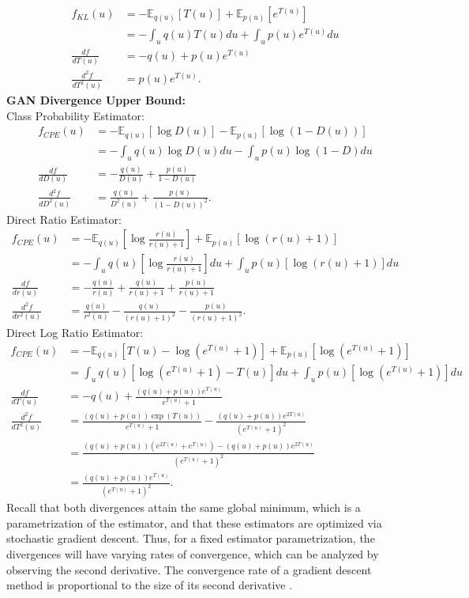 \documentclass[honours,12pt]{unswthesis}
\newcommand{\E}{\mathbb{E}}
\numberwithin{equation}{section}
\theoremstyle{definition}
\begin{document}
\begin{align*}
f_{KL}(u)&=-\E_{q(u)}[T(u)]+\E_{p(u)}[e^{T(u)}]\\
&=-\int_u q(u)T(u)du+\int_u p(u)e^{T(u)}du\\
\frac{df}{dT(u)}&=-q(u)+p(u)e^{T(u)}\\
\frac{d^2f}{dT^2(u)}&=p(u)e^{T(u)}.
\end{align*}
\textbf{GAN Divergence Upper Bound:}\\
Class Probability Estimator:
\begin{align*}
f_{CPE}(u)&=-\E_{q(u)}[\log D(u)]-\E_{p(u)}[\log (1-D(u))]\\
&=-\int_u q(u)\log D(u) du -\int_u p(u)\log(1-D)du\\
\frac{df}{dD(u)}&=-\frac{q(u)}{D(u)}+\frac{p(u)}{1-D(u)}\\
\frac{d^2f}{dD^2(u)}&=\frac{q(u)}{D^2(u)}+\frac{p(u)}{(1-D(u))^2}.
\end{align*}
Direct Ratio Estimator:
\begin{align*}
f_{CPE}(u)&=-\E_{q(u)}\left[\log \frac{r(u)}{r(u)+1}\right]+\E_{p(u)}\left[\log(r(u)+1)\right]\\
&=-\int_u q(u)\left[\log \frac{r(u)}{r(u)+1}\right]du+\int_u p(u)\left[\log(r(u)+1)\right]du\\
\frac{df}{dr(u)}&=-\frac{q(u)}{r(u)}+\frac{q(u)}{r(u)+1}+\frac{p(u)}{r(u)+1}\\
\frac{d^2f}{dr^2(u)}&=\frac{q(u)}{r^2(u)}-\frac{q(u)}{(r(u)+1)^2}-\frac{p(u)}{(r(u)+1)^2}.
\end{align*}
Direct Log Ratio Estimator:
\begin{align*}
f_{CPE}(u)&=-\E_{q(u)}[T(u)-\log(e^{T(u)}+1)]+\E_{p(u)}[\log(e^{T(u)}+1)]\\
&=\int_u q(u)[\log(e^{T(u)}+1)-T(u)] du+\int_u p(u)[\log(e^{T(u)}+1)]du\\
\frac{df}{dT(u)}&=-q(u)+\frac{(q(u)+p(u))e^{T(u)}}{e^{T(u)}+1}\\
\frac{d^2f}{dT^2(u)}&=\frac{(q(u)+p(u))\exp(T(u))}{e^{T(u)}+1}-\frac{(q(u)+p(u))e^{2T(u)}}{(e^{T(u)}+1)^2}\\
&=\frac{(q(u)+p(u))(e^{2T(u)}+e^{T(u)})-(q(u)+p(u))e^{2T(u)}}{(e^{T(u)}+1)^2}\\
&=\frac{(q(u)+p(u))e^{T(u)}}{(e^{T(u)}+1)^2}.
\end{align*}
Recall that both divergences attain the same global minimum, which is a parametrization of the estimator, and that these estimators are optimized via stochastic gradient descent. Thus, for a fixed estimator parametrization, the divergences will have varying rates of convergence, which can be analyzed by observing the second derivative. The convergence rate of a gradient descent method is proportional to the size of its second derivative \citep{lecun}.
\end{document}
